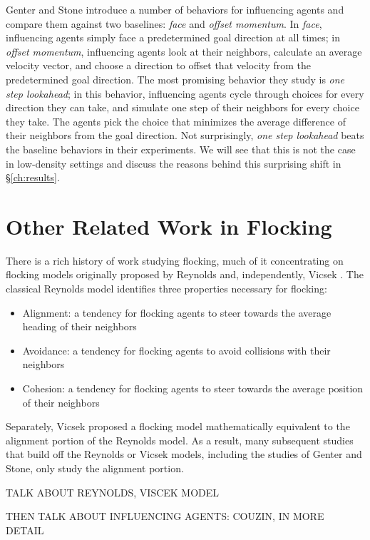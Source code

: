 Genter and Stone introduce a number of behaviors for influencing agents and
compare them against two baselines: \textit{face} and \textit{offset momentum}.
In \textit{face}, influencing agents simply face a predetermined goal direction
at all times; in \textit{offset momentum}, influencing agents look at their
neighbors, calculate an average velocity vector, and choose a direction to
offset that velocity from the predetermined goal direction.
The most promising behavior they study is \textit{one step lookahead}; in this
behavior, influencing agents cycle through choices for every direction they
can take, and simulate one step of their neighbors for every choice they take.
The agents pick the choice that minimizes the average difference of their
neighbors from the goal direction.
Not surprisingly, \textit{one step lookahead} beats the baseline behaviors in
their experiments.
We will see that this is not the case in low-density settings and discuss the
reasons behind this surprising shift in \S\ref{ch:results}.

\section{Other Related Work in Flocking}
There is a rich history of work studying flocking, much of it concentrating on
flocking models originally proposed by Reynolds \cite{reynoldsmodel} and,
independently, Vicsek \cite{vicsek1995}.
The classical Reynolds model identifies three properties necessary for
flocking:
\begin{itemize}
    \item Alignment: a tendency for flocking agents to steer towards the
            average heading of their neighbors
    \item Avoidance: a tendency for flocking agents to avoid collisions with
            their neighbors
    \item Cohesion: a tendency for flocking agents to steer towards the average
            position of their neighbors
\end{itemize}
\noindent Separately, Vicsek proposed a flocking model mathematically
equivalent to the alignment portion of the Reynolds model.
As a result, many subsequent studies that build off the Reynolds or Vicsek
models, including the studies of Genter and Stone, only study the alignment
portion.

TALK ABOUT REYNOLDS, VISCEK MODEL

THEN TALK ABOUT INFLUENCING AGENTS: COUZIN, IN MORE DETAIL

